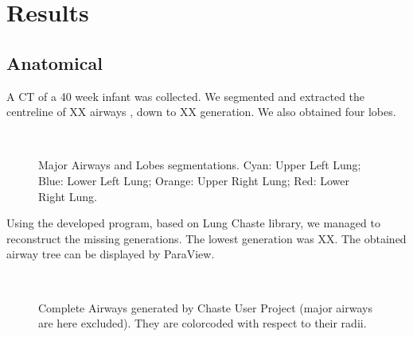 \section{Results}
\label{sec:results}



\subsection{Anatomical}
\label{subsec:anatomical_results}

A CT of a 40 week infant was collected. We segmented and extracted the
centreline of XX airways , down to XX generation.  We also obtained
four lobes.

\begin{figure}[H]\centering
  \hspace{1cm}
  \\

  \caption{Major Airways and Lobes segmentations.  Cyan: Upper Left
    Lung; Blue: Lower Left Lung; Orange: Upper Right Lung; Red: Lower
    Right Lung.}
  \label{fig:anatomical_results}
\end{figure}

Using the developed program, based on Lung Chaste library, we managed
to reconstruct the missing generations. The lowest generation was
XX. The obtained airway tree can be displayed by ParaView.

\begin{figure}[H]\centering
  \hspace{1cm}
  \\

  \caption{Complete Airways generated by Chaste User Project (major
    airways are here excluded).  They are colorcoded with respect to
    their radii.}
  \label{fig:complete_anatomical_results}
\end{figure}

